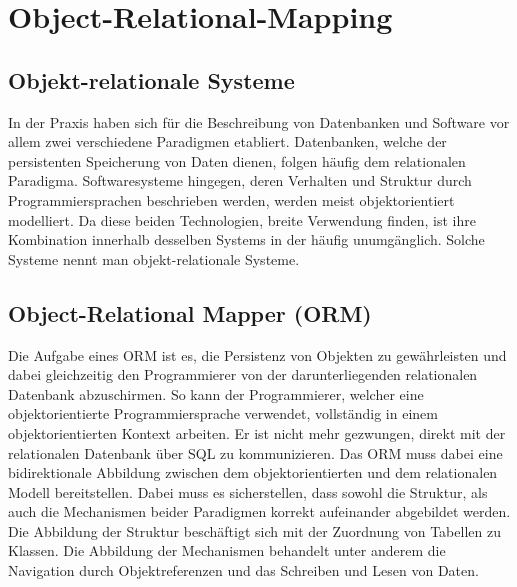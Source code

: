 \section{Object-Relational-Mapping}

\subsection{Objekt-relationale Systeme}
In der Praxis haben sich für die Beschreibung von Datenbanken und Software vor allem zwei verschiedene Paradigmen etabliert. Datenbanken, welche der persistenten Speicherung von Daten dienen, folgen häufig dem relationalen Paradigma. Softwaresysteme hingegen, deren Verhalten und Struktur durch Programmiersprachen beschrieben werden, werden meist objektorientiert modelliert. Da diese beiden Technologien, breite Verwendung finden, ist ihre Kombination innerhalb desselben Systems in der häufig unumgänglich. Solche Systeme nennt man objekt-relationale Systeme. \cite{ireland_understanding_2009}

\subsection{Object-Relational Mapper (ORM)}
Die Aufgabe eines ORM ist es, die Persistenz von Objekten zu gewährleisten \cite{noauthor_what_2023} und dabei gleichzeitig den Programmierer von der darunterliegenden relationalen Datenbank abzuschirmen. So kann der Programmierer, welcher eine objektorientierte Programmiersprache verwendet, vollständig in einem objektorientierten Kontext arbeiten. Er ist nicht mehr gezwungen, direkt mit der relationalen Datenbank über SQL zu kommunizieren. Das ORM muss dabei eine bidirektionale Abbildung zwischen dem objektorientierten und dem relationalen Modell bereitstellen. Dabei muss es sicherstellen, dass sowohl die Struktur, als auch die Mechanismen beider Paradigmen korrekt aufeinander abgebildet werden. Die Abbildung der Struktur beschäftigt sich mit der Zuordnung von Tabellen zu Klassen. Die Abbildung der Mechanismen behandelt unter anderem die Navigation durch Objektreferenzen und das Schreiben und Lesen von Daten. \cite{ireland_understanding_2009}

